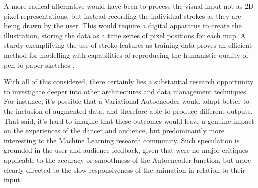 A more radical alternative would have been to process the visual input not as 2D pixel representations, but instead recording the individual strokes as they are being drawn by the user. This would require a digital apparatus to create the illustration, storing the data as a time series of pixel positions for each map. A sturdy exemplifying the use of stroke features as training data proves an efficient method for modelling with capabilities of reproducing the humanistic quality of pen-to-paper sketches \cite{ha_neural_2017}.

With all of this considered, there certainly lies a substantial research opportunity to investigate deeper into other architectures and data management techniques. For instance, it's possible that a Variational Autoencoder would adapt better to the inclusion of augmented data, and therefore able to produce different outputs. That said, it's hard to imagine that these outcomes would leave a genuine impact on the experiences of the dancer and audience, but predominantly more interesting to the Machine Learning research community. Such speculation is grounded in the user and audience feedback, given that were no major critiques applicable to the accuracy or smoothness of the Autoencoder function, but more clearly directed to the slow responsiveness of the animation in relation to their input.
